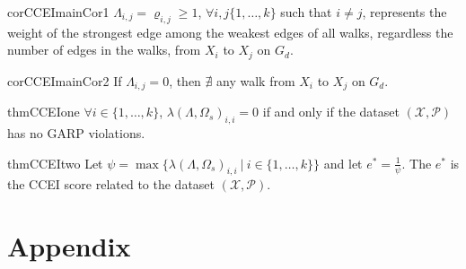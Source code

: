\documentclass{article} %
\theoremstyle{style1}
\theoremstyle{style1}
\theoremstyle{example}
\begin{document}
\begin{restatable}{cor}{CCEImainCor1}\label{thm:CCEI_mainCor1}
$\Lambda_{i,j}=\varrho_{i,j}\geq1$, $\forall i,j\{1,\ldots,k\}$ such that $i\not=j$, represents the weight of the strongest edge among the weakest edges of all walks, regardless the number of edges in the walks, from $X_i$ to $X_j$ on $G_d$.
\end{restatable}

\begin{restatable}{cor}{CCEImainCor2}\label{thm:CCEI_mainCor2}
If $\Lambda_{i,j}=0$, then $\nexists$ any walk from $X_i$ to $X_j$ on $G_d$.
\end{restatable}

\begin{restatable}{thm}{CCEIone}
\label{thm:CCEI_1}
$\forall i\in\{1,\ldots,k\}$, $\lambda(\Lambda,\Omega_s)_{i,i}=0$ if and only if the dataset $(\mathcal{X},\mathcal{P})$ has no GARP violations. 
\end{restatable}

\begin{restatable}{thm}{CCEItwo}
\label{thm:CCEI_2}
Let $\psi = \max\big\{\lambda(\Lambda,\Omega_s)_{i,i}\ |\ i\in\{1,\ldots,k\}\big\}$ and let $e^*=\frac{1}{\psi}$. The $e^*$ is the CCEI score related to the dataset $(\mathcal{X},\mathcal{P})$.
\end{restatable}

\section{Appendix}
\WGARP*
\end{document}
